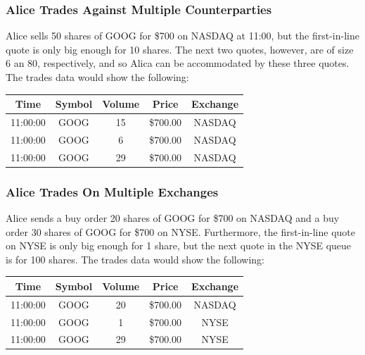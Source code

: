 \documentclass{article}
\begin{document}
\subsubsection{Alice Trades Against Multiple Counterparties}
Alice sells 50 shares of GOOG for \$700 on NASDAQ at 11:00, but the first-in-line quote is only big enough for 10 shares. The next two quotes, however, are of size 6 an 80, respectively, and so Alica can be accommodated by these three quotes. The trades data would show the following:
\begin{center}
  \begin{tabular}{| c | c | c | c | c |}
    \hline
    Time & Symbol & Volume & Price & Exchange \\ \hline
    11:00:00 & GOOG & 15 & \$700.00 & NASDAQ \\ \hline
    11:00:00 & GOOG & 6 & \$700.00 & NASDAQ \\ \hline
    11:00:00 & GOOG & 29 & \$700.00 & NASDAQ \\
    \hline
  \end{tabular}
\end{center}
\subsubsection{Alice Trades On Multiple Exchanges}
Alice sends a buy order 20 shares of GOOG for \$700 on NASDAQ and a buy order 30 shares of GOOG for \$700 on NYSE. Furthermore, the first-in-line quote on NYSE is only big enough for 1 share, but the next quote in the NYSE queue is for 100 shares. The trades data would show the following:
\begin{center}
  \begin{tabular}{| c | c | c | c | c |}
    \hline
    Time & Symbol & Volume & Price & Exchange \\ \hline
    11:00:00 & GOOG & 20 & \$700.00 & NASDAQ \\ \hline
    11:00:00 & GOOG & 1 & \$700.00 & NYSE \\ \hline
    11:00:00 & GOOG & 29 & \$700.00 & NYSE \\
    \hline
  \end{tabular}
\end{center}
\end{document}
